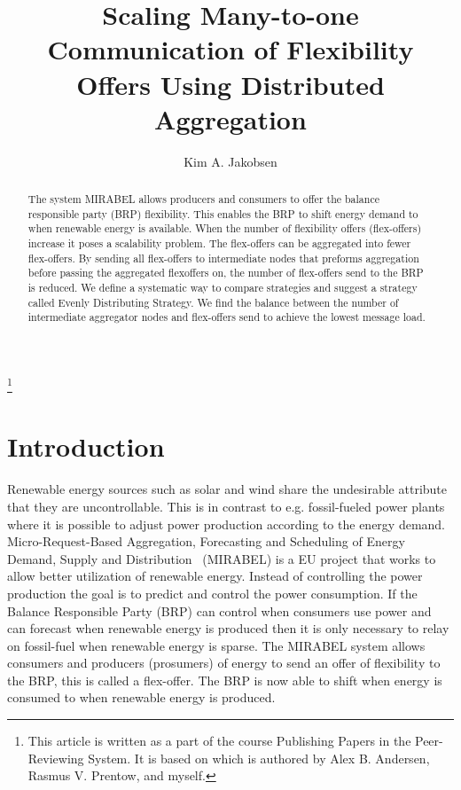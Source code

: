 \documentclass{ifacconf}
\begin{document}
\begin{frontmatter}

\title{Scaling Many-to-one Communication of Flexibility Offers Using Distributed Aggregation} %

\thanks[footnoteinfo]{This article is written as a part of the course Publishing Papers in the Peer-Reviewing System. It is based on \cite{SCEDFDA} which is authored by Alex B. Andersen, Rasmus V. Prentow, and myself.}

\author[First]{Kim A. Jakobsen} 


\address[First]{Department of Computer Science, Aalborg University, Selma Lagerl\"{o}fs Vej 300 DK-9220 Aalborg East (e-mail: kjakob09@student.aau.dk).}                                              


\begin{abstract}                          
The system MIRABEL allows producers and consumers to offer the balance responsible party (BRP) flexibility. 
This enables the BRP to shift energy demand to when renewable energy is available. 
When the number of flexibility offers (flex-offers) increase it poses a scalability problem. 
The flex-offers can be aggregated into fewer flex-offers. 
By sending all flex-offers to intermediate nodes that preforms aggregation before passing the aggregated flexoffers on, the number of flex-offers send to the BRP is reduced.
We define a systematic way to compare strategies and suggest a strategy called Evenly Distributing Strategy. 
We find the balance between the number of intermediate aggregator nodes and flex-offers send to achieve the lowest message load. 
\end{abstract}

\end{frontmatter}

\section{Introduction}
Renewable energy sources such as solar and wind share the undesirable attribute that they are uncontrollable. 
This is in contrast to e.g. fossil-fueled power plants where it is possible to adjust power production according to the energy demand. 
Micro-Request-Based Aggregation, Forecasting and Scheduling of Energy Demand, Supply and Distribution~\cite{mirabel} (MIRABEL) is a EU project that works to allow better utilization of renewable energy. 
Instead of controlling the power production the goal is to predict and control the power consumption. 
If the Balance Responsible Party (BRP) can control when consumers use power and can forecast when renewable energy is produced then it is only necessary to relay on fossil-fuel when renewable energy is sparse.
The MIRABEL system allows consumers and producers (prosumers) of energy to send an offer of flexibility to the BRP, this is called a flex-offer. 
The BRP is now able to shift when energy is consumed to when renewable energy is produced.
\end{document}
